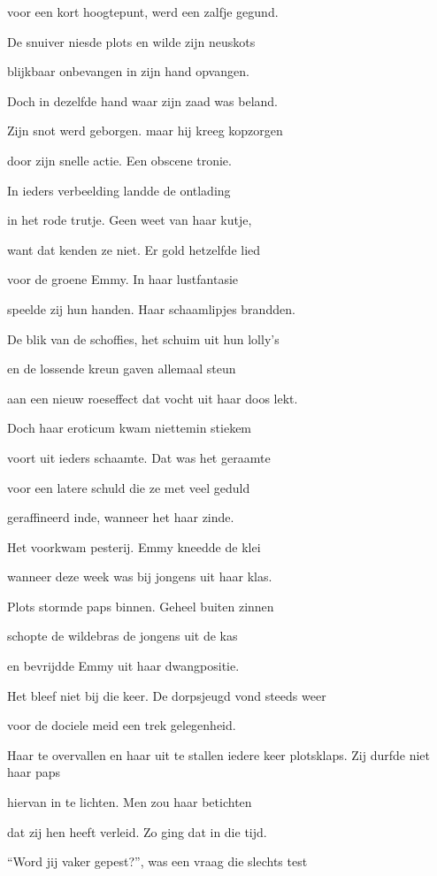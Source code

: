 voor een kort hoogtepunt,
werd een zalfje gegund.

De snuiver niesde plots
en wilde zijn neuskots

blijkbaar onbevangen
in zijn hand opvangen.

Doch in dezelfde hand
waar zijn zaad was beland.

Zijn snot werd geborgen.
maar hij kreeg kopzorgen

door zijn snelle actie.
Een obscene tronie.

In ieders verbeelding
landde de ontlading

in het rode trutje.
Geen weet van haar kutje,

want dat kenden ze niet.
Er gold hetzelfde lied

voor de groene Emmy.
In haar lustfantasie

speelde zij hun handen.
Haar schaamlipjes brandden.

De blik van de schoffies,
het schuim uit hun lolly’s

en de lossende kreun
gaven allemaal steun

aan een nieuw roeseffect
dat vocht uit haar doos lekt.

Doch haar eroticum
kwam niettemin stiekem

voort uit ieders schaamte.
Dat was het geraamte

voor een latere schuld
die ze met veel geduld

geraffineerd inde,
wanneer het haar zinde.

Het voorkwam pesterij.
Emmy kneedde de klei

wanneer deze week was
bij jongens uit haar klas.

Plots stormde paps binnen.
Geheel buiten zinnen

schopte de wildebras
de jongens uit de kas

en bevrijdde Emmy
uit haar dwangpositie.

Het bleef niet bij die keer.
De dorpsjeugd vond steeds weer

voor de dociele meid
een trek gelegenheid.

Haar te overvallen
en haar uit te stallen
iedere keer plotsklaps.
Zij durfde niet haar paps

hiervan in te lichten.
Men zou haar betichten

dat zij hen heeft verleid.
Zo ging dat in die tijd.

“Word jij vaker gepest?”,
was een vraag die slechts test

